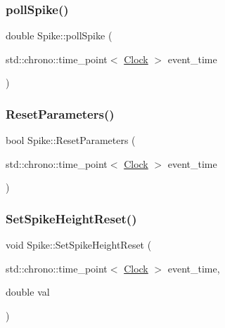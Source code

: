 \mbox{\label{classSpike_ac465dbe6500f1eb1f5421f7174f91dd3}} 
\subsubsection{\texorpdfstring{poll\+Spike()}{pollSpike()}}
{\footnotesize\ttfamily double Spike\+::poll\+Spike (\begin{DoxyParamCaption}\item[{std\+::chrono\+::time\+\_\+point$<$ \mbox{\hyperlink{universe_8h_a0ef8d951d1ca5ab3cfaf7ab4c7a6fd80}{Clock}} $>$}]{event\+\_\+time }\end{DoxyParamCaption})\hspace{0.3cm}{\ttfamily [inline]}}

\mbox{\label{classSpike_af4475560da7a33e70a0f2036197f000f}} 
\subsubsection{\texorpdfstring{Reset\+Parameters()}{ResetParameters()}}
{\footnotesize\ttfamily bool Spike\+::\+Reset\+Parameters (\begin{DoxyParamCaption}\item[{std\+::chrono\+::time\+\_\+point$<$ \mbox{\hyperlink{universe_8h_a0ef8d951d1ca5ab3cfaf7ab4c7a6fd80}{Clock}} $>$}]{event\+\_\+time }\end{DoxyParamCaption})}

\mbox{\label{classSpike_a872adf39d66b0f491fb179c9745d7d11}} 
\subsubsection{\texorpdfstring{Set\+Spike\+Height\+Reset()}{SetSpikeHeightReset()}}
{\footnotesize\ttfamily void Spike\+::\+Set\+Spike\+Height\+Reset (\begin{DoxyParamCaption}\item[{std\+::chrono\+::time\+\_\+point$<$ \mbox{\hyperlink{universe_8h_a0ef8d951d1ca5ab3cfaf7ab4c7a6fd80}{Clock}} $>$}]{event\+\_\+time,  }\item[{double}]{val }\end{DoxyParamCaption})\hspace{0.3cm}{\ttfamily [inline]}}

